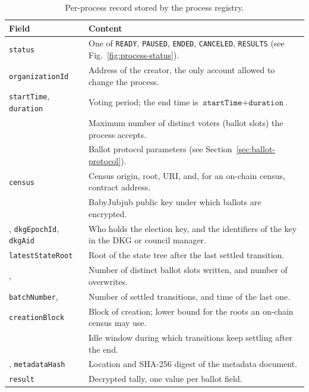\begin{table}[h]
	\centering
	\caption{Per-process record stored by the process registry.}
	\label{tab:process-record}
	\small
	\begin{tabular}{p{} p{}}
		\toprule
		\textbf{Field} & \textbf{Content} \\
		\midrule
		\texttt{status} & One of \texttt{READY}, \texttt{PAUSED}, \texttt{ENDED}, \texttt{CANCELED}, \texttt{RESULTS} (see Fig.~\ref{fig:process-status}). \\
		\texttt{organizationId} & Address of the creator, the only account allowed to change the process. \\
		\texttt{startTime}, \texttt{duration} & Voting period; the end time is $\texttt{startTime} + \texttt{duration}$. \\
		\maxvoters & Maximum number of distinct voters (ballot slots) the process accepts. \\
		\ballotmode & Ballot protocol parameters (see Section~\ref{sec:ballot-protocol}). \\
		\texttt{census} & Census origin, root, \ac{URI}, and, for an on-chain census, contract address. \\
		\epk & BabyJubjub public key under which ballots are encrypted. \\
		\keymode, \texttt{dkgEpochId}, \texttt{dkgAid} & Who holds the election key, and the identifiers of the key in the \ac{DKG} or council manager. \\
		\texttt{latestStateRoot} & Root of the state tree after the last settled transition. \\
		\voterscount, \overwrittencount & Number of distinct ballot slots written, and number of overwrites. \\
		\texttt{batchNumber}, \lastvoteat & Number of settled transitions, and time of the last one. \\
		\texttt{creationBlock} & Block of creation; lower bound for the roots an on-chain census may use. \\
		\grace & Idle window during which transitions keep settling after the end. \\
		\metadatauri, \texttt{metadataHash} & Location and SHA-256 digest of the metadata document. \\
		\texttt{result} & Decrypted tally, one value per ballot field. \\
		\bottomrule
	\end{tabular}
\end{table}

